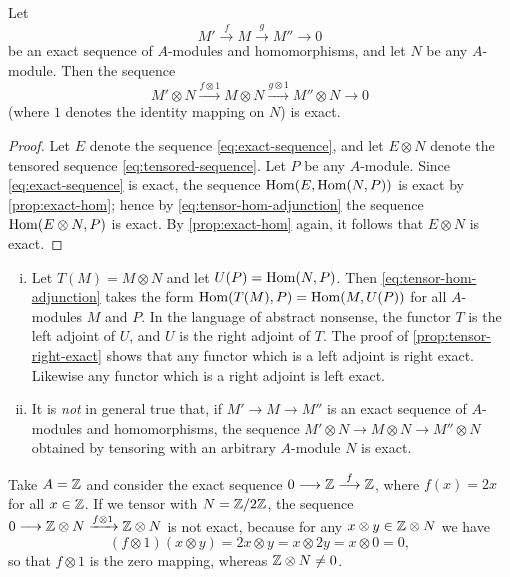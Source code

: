 \begin{proposition}\label{prop:tensor-right-exact}
Let \begin{equation}\label{eq:exact-sequence}
    M' \stackrel{f}{\longrightarrow} M \stackrel{g}{\longrightarrow} M'' \longrightarrow 0 \tag{2}
\end{equation}
be an exact sequence of $A$-modules and homomorphisms, and let $N$ be any $A$-module. Then the sequence
\begin{equation}\label{eq:tensored-sequence}
    M' \otimes N \xrightarrow{f \otimes 1} M \otimes N \xrightarrow{g \otimes 1} M'' \otimes N \longrightarrow 0 \tag{3}
\end{equation}
(where $1$ denotes the identity mapping on $N$) is exact.
\end{proposition}

\begin{proof}
Let $E$ denote the sequence \eqref{eq:exact-sequence}, and let $E \otimes N$ denote the tensored sequence \eqref{eq:tensored-sequence}. Let $P$ be any $A$-module. Since \eqref{eq:exact-sequence} is exact, the sequence $\operatorname{Hom}(E, \operatorname{Hom}(N, P))$ is exact by \eqref{prop:exact-hom}; hence by \eqref{eq:tensor-hom-adjunction} the sequence $\operatorname{Hom}(E \otimes N, P)$ is exact. By \eqref{prop:exact-hom} again, it follows that $E \otimes N$ is exact.
\end{proof}

\begin{remarks}
    \begin{enumerate}[i)]
        \item Let $T(M) = M \otimes N$ and let $U(P) = \operatorname{Hom}(N, P)$. Then \eqref{eq:tensor-hom-adjunction} takes the form $\operatorname{Hom}(T(M), P) = \operatorname{Hom}(M, U(P))$ for all $A$-modules $M$ and $P$. In the language of abstract nonsense, the functor $T$ is the left adjoint of $U$, and $U$ is the right adjoint of $T$. The proof of \eqref{prop:tensor-right-exact} shows that any functor which is a left adjoint is right exact. Likewise any functor which is a right adjoint is left exact.
        \item It is \emph{not} in general true that, if $M' \longrightarrow M \longrightarrow M''$ is an exact sequence of $A$-modules and homomorphisms, the sequence $M' \otimes N \longrightarrow M \otimes N \longrightarrow M'' \otimes N$ obtained by tensoring with an arbitrary $A$-module $N$ is exact.
    \end{enumerate}
\end{remarks}

\begin{example}
Take $A = \mathbb{Z}$ and consider the exact sequence $0 \longrightarrow \mathbb{Z} \stackrel{f}{\longrightarrow} \mathbb{Z}$, where $f(x) = 2x$ for all $x \in \mathbb{Z}$. If we tensor with $N = \mathbb{Z}/2\mathbb{Z}$, the sequence $0 \longrightarrow \mathbb{Z} \otimes N \xrightarrow{f \otimes 1} \mathbb{Z} \otimes N$ is not exact, because for any $x \otimes y \in \mathbb{Z} \otimes N$ we have
\[
    (f \otimes 1)(x \otimes y) = 2x \otimes y = x \otimes 2y = x \otimes 0 = 0,
\]
so that $f \otimes 1$ is the zero mapping, whereas $\mathbb{Z} \otimes N \neq 0$.
\end{example}

